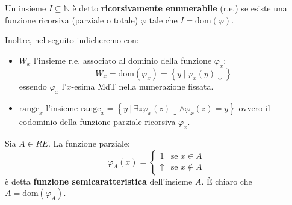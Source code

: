 \documentclass[a4paper]{article}
\begin{document}
	Un insieme $I \subseteq \mathbb{N}$ è detto \textcolor{Red3}{\textbf{ricorsivamente enumerabile}} (r.e.) se esiste una funzione ricorsiva (parziale o totale) $\varphi$ tale che $I = \mathrm{dom}\left(\varphi\right)$.\newline
	
	\noindent
	Inoltre, nel seguito indicheremo con:
	\begin{itemize}
		\item $W_{x}$ l'insieme r.e. associato al dominio della funzione $\varphi_{x}$:
		\begin{equation*}
			W_{x} = \mathrm{dom}\left(\varphi_{x}\right) = \left\{y \: | \: \varphi_{x}\left(y\right) \downarrow\right\}
		\end{equation*}
		essendo $\varphi_{x}$ l'$x$-esima MdT nella numerazione fissata.
		
		\item $\mathrm{range}_{x}$ l'insieme $\mathrm{range}_{x} = \left\{y \: | \: \exists z \varphi_{x}\left(z\right)\downarrow \land \varphi_{x}\left(z\right) = y\right\}$ ovvero il codominio della funzione parziale ricorsiva $\varphi_{x}$.
	\end{itemize}
	Sia $A \in RE$. La funzione parziale:
	\begin{equation*}
		\varphi_{A}\left(x\right) = \begin{cases}
			1			& \text{se } x \in A \\
			\uparrow	& \text{se } x \notin A
		\end{cases}
	\end{equation*}
	è detta \textbf{funzione semicaratteristica} dell'insieme $A$. È chiaro che $A = \mathrm{dom}\left(\varphi_{A}\right)$.\newline
	
\end{document}
